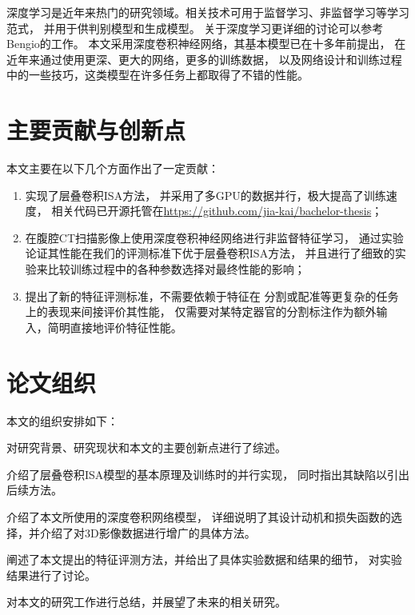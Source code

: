 深度学习是近年来热门的研究领域。相关技术可用于监督学习、非监督学习等学习范式，
并用于供判别模型和生成模型。
关于深度学习更详细的讨论可以参考Bengio的工作\cite{bengio2009learning}。
本文采用深度卷积神经网络，其基本模型已在十多年前提出\cite{lecun1998gradient}，
在近年来通过使用更深、更大的网络，更多的训练数据，
以及网络设计和训练过程中的一些技巧，这类模型在许多任务上都取得了不错的性能。


\section{主要贡献与创新点}
本文主要在以下几个方面作出了一定贡献：

\begin{enumerate}
    \item 实现了层叠卷积ISA方法\cite{wu2013unsupervised}，
        并采用了多GPU的数据并行，极大提高了训练速度，
        相关代码已开源托管在\url{https://github.com/jia-kai/bachelor-thesis}；
    \item 在腹腔CT扫描影像上使用深度卷积神经网络进行非监督特征学习，
        通过实验论证其性能在我们的评测标准下优于层叠卷积ISA方法，
        并且进行了细致的实验来比较训练过程中的各种参数选择对最终性能的影响；
    \item 提出了新的特征评测标准，不需要依赖于特征在
        分割或配准等更复杂的任务上的表现来间接评价其性能，
        仅需要对某特定器官的分割标注作为额外输入，简明直接地评价特征性能。
\end{enumerate}

\section{论文组织}
本文的组织安排如下：

对研究背景、研究现状和本文的主要创新点进行了综述。

介绍了层叠卷积ISA模型的基本原理及训练时的并行实现，
同时指出其缺陷以引出后续方法。

介绍了本文所使用的深度卷积网络模型，
详细说明了其设计动机和损失函数的选择，并介绍了对3D影像数据进行增广的具体方法。

阐述了本文提出的特征评测方法，并给出了具体实验数据和结果的细节，
对实验结果进行了讨论。

对本文的研究工作进行总结，并展望了未来的相关研究。

